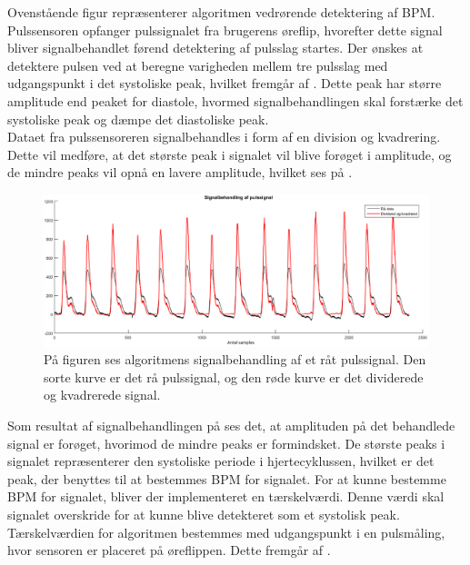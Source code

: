 Ovenstående figur repræsenterer algoritmen vedrørende detektering af BPM. Pulssensoren opfanger pulssignalet fra brugerens øreflip, hvorefter dette signal bliver signalbehandlet førend detektering af pulsslag startes. Der ønskes at detektere pulsen ved at beregne varigheden mellem tre pulsslag med udgangspunkt i det systoliske peak, hvilket fremgår af . Dette peak har større amplitude end peaket for diastole, hvormed signalbehandlingen skal forstærke det systoliske peak og dæmpe det diastoliske peak.  \\
Dataet fra pulssensoreren signalbehandles i form af en division og kvadrering. Dette vil medføre, at det største peak i signalet vil blive forøget i amplitude, og de mindre peaks vil opnå en lavere amplitude, hvilket ses på . 
\begin{figure}[H]
	\centering
	\includegraphics[scale=0.4]{figures/cDesign/puls_ore_behandlet.png}
	\caption{På figuren ses algoritmens signalbehandling af et råt pulssignal. Den sorte kurve er det rå pulssignal, og den røde kurve er det dividerede og kvadrerede signal.}
	\label{fig:behandlet_puls}
\end{figure}
Som resultat af signalbehandlingen på  ses det, at amplituden på det behandlede signal er forøget, hvorimod de mindre peaks er formindsket. De største peaks i signalet repræsenterer den systoliske periode i hjertecyklussen, hvilket er det peak, der benyttes til at bestemmes BPM for signalet. For at kunne bestemme BPM for signalet, bliver der implementeret en tærskelværdi. Denne værdi skal signalet overskride for at kunne blive detekteret som et systolisk peak. Tærskelværdien for algoritmen bestemmes med udgangspunkt i en pulsmåling, hvor sensoren er placeret på øreflippen. Dette fremgår af .
